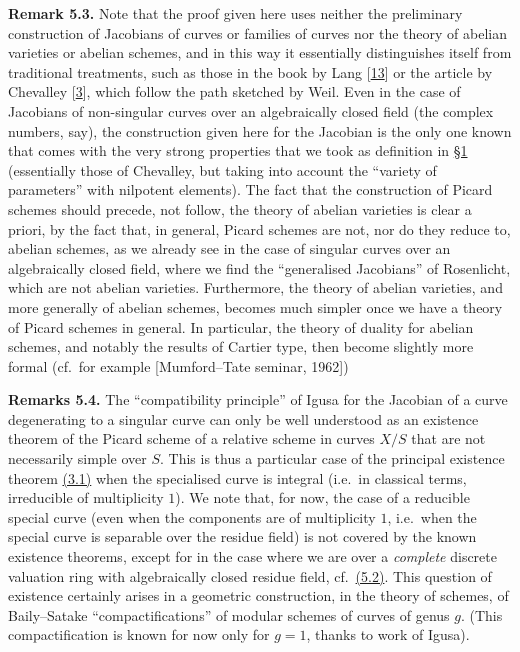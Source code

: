 \documentclass{article}
\newenvironment{rmenv}[1]
  {\phantomsection\par\smallskip\noindent\textbf{#1.}\rmfamily}
  {\par\smallskip}
\theoremstyle{definition}
\theoremstyle{definition}
\theoremstyle{definition}
\theoremstyle{definition}
\theoremstyle{remark}
\begin{document}
\leavevmode{}%
\begin{rmenv}{Remark 5.3}
Note that the proof given here uses neither the preliminary construction of Jacobians of curves or families of curves nor the theory of abelian varieties or abelian schemes, and in this way it essentially distinguishes itself from traditional treatments, such as those in the book by Lang {[}\protect\hyperlink{ref-Lan1959}{13}{]} or the article by Chevalley {[}\protect\hyperlink{ref-Che1960}{3}{]}, which follow the path sketched by Weil.
Even in the case of Jacobians of non-singular curves over an algebraically closed field (the complex numbers, say), the construction given here for the Jacobian is the only one known that comes with the very strong properties that we took as definition in \protect\hyperlink{fga-3-v-section-1}{§1} (essentially those of Chevalley, but taking into account the ``variety of parameters'' with nilpotent elements).
The fact that the construction of Picard schemes should precede, not follow, the theory of abelian varieties is clear a priori, by the fact that, in general, Picard schemes are not, nor do they reduce to, abelian schemes, as we already see in the case of singular curves over an algebraically closed field, where we find the ``generalised Jacobians'' of Rosenlicht, which are not abelian varieties.
Furthermore, the theory of abelian varieties, and more generally of abelian schemes, becomes much simpler once we have a theory of Picard schemes in general.
In particular, the theory of duality for abelian schemes, and notably the results of Cartier type, then become slightly more formal (cf.~for example {[}Mumford--Tate seminar, 1962{]})

\end{rmenv}

\leavevmode{}%
\begin{rmenv}{Remarks 5.4}
The ``compatibility principle'' of Igusa for the Jacobian of a curve degenerating to a singular curve can only be well understood as an existence theorem of the Picard scheme of a relative scheme in curves \(X/S\) that are not necessarily simple over \(S\).
This is thus a particular case of the principal existence theorem \protect\hyperlink{fga-3-v-theorem-3.1}{(3.1)} when the specialised curve is integral (i.e.~in classical terms, irreducible of multiplicity \(1\)).
We note that, for now, the case of a reducible special curve (even when the components are of multiplicity \(1\), i.e.~when the special curve is separable over the residue field) is not covered by the known existence theorems, except for in the case where we are over a \emph{complete} discrete valuation ring with algebraically closed residue field, cf.~\protect\hyperlink{fga-3-v-remarks-5.2}{(5.2)}.
This question of existence certainly arises in a geometric construction, in the theory of schemes, of Baily--Satake ``compactifications'' of modular schemes of curves of genus \(g\).
(This compactification is known for now only for \(g=1\), thanks to work of Igusa).

\end{rmenv}
\end{document}
